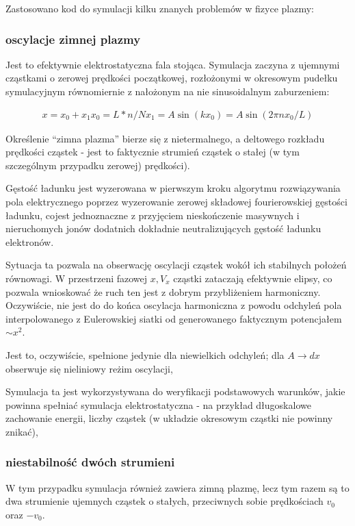     Zastosowano kod do symulacji kilku znanych problemów w fizyce plazmy:
    \subsubsection{oscylacje zimnej plazmy}
    Jest to efektywnie elektrostatyczna fala stojąca. Symulacja zaczyna z ujemnymi cząstkami
o zerowej prędkości początkowej, rozłożonymi w okresowym pudełku symulacyjnym
równomiernie z nałożonym na nie sinusoidalnym zaburzeniem:

\begin{align}
x = x_0 + x_1
x_0 = L * n / N
x_1 = A  \sin(k x_0)=A \sin(2 \pi n x_0 / L)
\end{align}

Określenie ``zimna plazma'' bierze się z nietermalnego, a deltowego
rozkładu prędkości cząstek - jest to faktycznie strumień cząstek o stałej
(w tym szczególnym przypadku zerowej) prędkości).

Gęstość ładunku jest wyzerowana w pierwszym kroku algorytmu rozwiązywania pola elektrycznego
poprzez wyzerowanie zerowej składowej fourierowskiej gęstości ładunku, cojest jednoznaczne 
z przyjęciem nieskończenie masywnych i nieruchomych jonów dodatnich dokładnie neutralizujących gęstość
ładunku elektronów.

Sytuacja ta
pozwala na obserwację oscylacji cząstek wokół ich stabilnych położeń
równowagi. W przestrzeni fazowej $x, V_x$ cząstki zataczają efektywnie
elipsy, co pozwala wnioskować że ruch ten jest z dobrym przybliżeniem harmoniczny.
Oczywiście, nie jest do do końca oscylacja harmoniczna z powodu odchyleń pola interpolowanego
z Eulerowskiej siatki od generowanego faktycznym potencjałem $ \sim x^2 $.

Jest to, oczywiście, spełnione jedynie dla niewielkich odchyleń; dla $A \to
dx$  obserwuje się nieliniowy reżim oscylacji, 

Symulacja ta jest wykorzystywana do weryfikacji podstawowych warunków, jakie powinna spełniać
symulacja elektrostatyczna - na przykład długoskalowe zachowanie energii, liczby cząstek (w układzie okresowym cząstki nie powinny
znikać), %

    \subsubsection{niestabilność dwóch strumieni}
W tym przypadku symulacja również zawiera zimną plazmę, lecz tym razem są to dwa strumienie ujemnych cząstek
o stałych, przeciwnych sobie prędkościach $v_0$ oraz $-v_0$.

